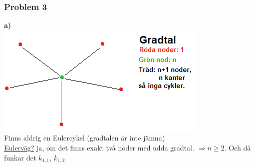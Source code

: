 \documentclass{article}
\begin{document}
            \subsubsection{Problem 3}
                \begin{tabbing}
                    \indent \textbf{a)}\hspace{5pt}\=\\
                    \>\includegraphics[scale=0.3]{img03.png}\\
                    \>Finns aldrig en Eulercykel (gradtalen är inte jämna)\\
                    \>\underline{Eulerväg?} ja, om det finns exakt två noder med udda gradtal. $\Rightarrow n\geq 2$.
                    Och då funkar det $k_{1,1}$, $k_{1,2}$
                \end{tabbing}
\end{document}
